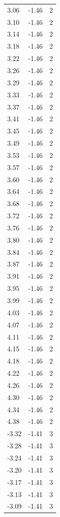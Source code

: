 \begin{longtable}{lrr}
  3.06 & -1.46 & 2 \\
  3.10 & -1.46 & 2 \\
  3.14 & -1.46 & 2 \\
  3.18 & -1.46 & 2 \\
  3.22 & -1.46 & 2 \\
  3.26 & -1.46 & 2 \\
  3.29 & -1.46 & 2 \\
  3.33 & -1.46 & 2 \\
  3.37 & -1.46 & 2 \\
  3.41 & -1.46 & 2 \\
  3.45 & -1.46 & 2 \\
  3.49 & -1.46 & 2 \\
  3.53 & -1.46 & 2 \\
  3.57 & -1.46 & 2 \\
  3.60 & -1.46 & 2 \\
  3.64 & -1.46 & 2 \\
  3.68 & -1.46 & 2 \\
  3.72 & -1.46 & 2 \\
  3.76 & -1.46 & 2 \\
  3.80 & -1.46 & 2 \\
  3.84 & -1.46 & 2 \\
  3.87 & -1.46 & 2 \\
  3.91 & -1.46 & 2 \\
  3.95 & -1.46 & 2 \\
  3.99 & -1.46 & 2 \\
  4.03 & -1.46 & 2 \\
  4.07 & -1.46 & 2 \\
  4.11 & -1.46 & 2 \\
  4.15 & -1.46 & 2 \\
  4.18 & -1.46 & 2 \\
  4.22 & -1.46 & 2 \\
  4.26 & -1.46 & 2 \\
  4.30 & -1.46 & 2 \\
  4.34 & -1.46 & 2 \\
  4.38 & -1.46 & 2 \\
  -3.32 & -1.41 & 3 \\
  -3.28 & -1.41 & 3 \\
  -3.24 & -1.41 & 3 \\
  -3.20 & -1.41 & 3 \\
  -3.17 & -1.41 & 3 \\
  -3.13 & -1.41 & 3 \\
  -3.09 & -1.41 & 3 \\

\end{longtable}

